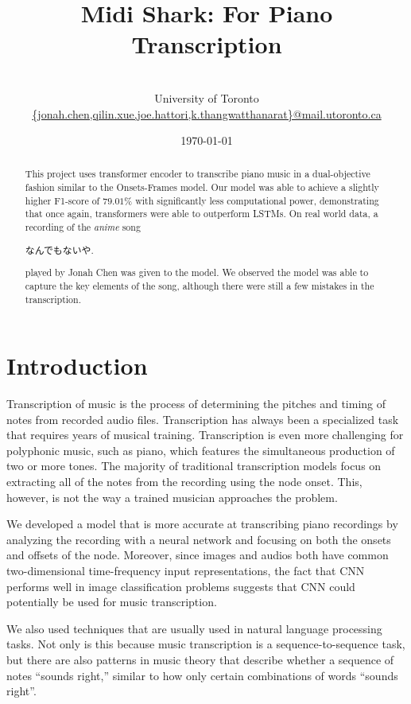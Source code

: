 \documentclass[a4paper,twocolumn,10pt]{article}
\title{\vspace{-50pt}\bfseries{\Large{Midi Shark: For Piano Transcription}}}
\author{\normalfont{Jonah Chen, QiLin Xue, Joe Hattori, Khanatat Thangwatthanarat}\\\small{University of Toronto}\\\vspace{-10pt}\small{\url{{jonah.chen,qilin.xue,joe.hattori,k.thangwatthanarat}@mail.utoronto.ca}}}
\date{\today}
\begin{document}
\maketitle
\begin{abstract}
  This project uses transformer encoder to transcribe piano music in a dual-objective fashion similar to the Onsets-Frames model\cite{onsets_and_frames}. Our model was able to achieve a slightly higher F1-score of \(79.01\%\) with significantly less computational power, demonstrating that once again, transformers were able to outperform LSTMs. On real world data, a recording of the \textit{anime} song \begin{CJK}{UTF8}{min}なんでもないや.\end{CJK} played by Jonah Chen was given to the model. We observed the model was able to capture the key elements of the song, although there were still a few mistakes in the transcription.
\end{abstract}
\section{Introduction}
Transcription of music is the process of determining the pitches and timing of notes from recorded audio files. Transcription has always been a specialized task that requires years of musical training. Transcription is even more challenging for polyphonic music, such as piano, which features the simultaneous production of two or more tones. The majority of traditional transcription models focus on extracting all of the notes from the recording using the node onset. This, however, is not the way a trained musician approaches the problem\cite{intro}.

We developed a model that is more accurate at transcribing piano recordings by analyzing the recording with a neural network and focusing on both the onsets and offsets of the node. Moreover, since images and audios both have common two-dimensional time-frequency input representations, the fact that CNN performs well in image classification problems suggests that CNN could potentially be used for music transcription\cite{onsets_and_frames}.

We also used techniques that are usually used in natural language processing tasks. Not only is this because music transcription is a sequence-to-sequence task, but there are also patterns in music theory that describe whether a sequence of notes ``sounds right,'' similar to how only certain combinations of words ``sounds right''\cite{onsets_and_frames}. 
\end{document}
